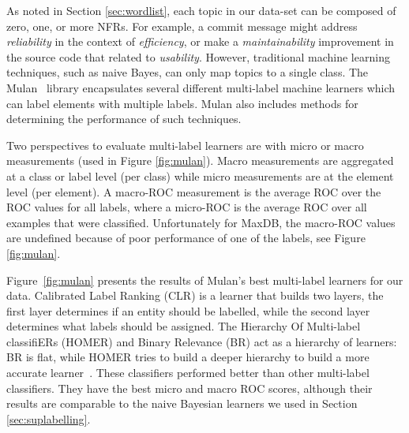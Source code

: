 \documentclass[]{sig-alternate}
\begin{document}
As noted in Section \ref{sec:wordlist}, each topic in our data-set can be composed of zero, one, or more NFRs. 
For example, a commit message might address \textit{reliability} in the context of \textit{efficiency}, or make a \textit{maintainability} improvement in the source code that related to \textit{usability}. 
However, traditional machine learning techniques, such as naive Bayes, can only map topics to a single class. 
The Mulan~\cite{mulan} library encapsulates several different multi-label machine learners which can label elements with multiple labels.
Mulan also includes methods for determining the performance of such techniques.


Two perspectives to evaluate multi-label learners are with micro or macro measurements (used in Figure \ref{fig:mulan}).
Macro measurements are aggregated at a class or label level (per class) while micro measurements are at the element level (per element).
A macro-ROC measurement is the average ROC over the ROC values for all labels, where a micro-ROC is the average ROC over all examples that were classified. 
Unfortunately for MaxDB, the macro-ROC values are undefined because of poor performance of one of the labels, see Figure \ref{fig:mulan}.

Figure~\ref{fig:mulan} presents the results of Mulan's best multi-label learners for our data. 
Calibrated Label Ranking (CLR) is a learner that builds two layers, the first layer determines if an entity should be labelled, while the second layer determines what labels should be assigned.
The Hierarchy Of Multi-label classifiERs (HOMER) and Binary Relevance (BR) act as a hierarchy of learners: BR is flat, while HOMER tries to build a deeper hierarchy to build a more accurate learner~\cite{mulan}. 
These classifiers performed better than other multi-label classifiers. 
They have the best micro and macro ROC scores, although their results are comparable to the naive Bayesian learners we used in Section \ref{sec:suplabelling}.
\end{document}
